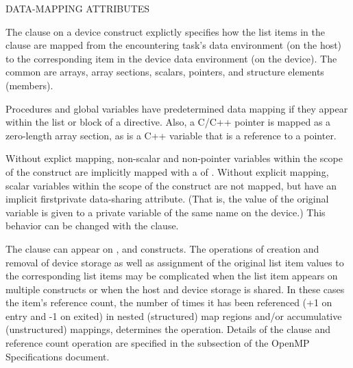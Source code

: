 \bigskip
DATA-MAPPING ATTRIBUTES

The  clause on a device construct explictly specifies how the list items in
the clause are mapped from the encountering task's data environment (on the host)
to the corresponding item in the device data environment (on the device).
The common  are arrays, array sections, scalars, pointers, and
structure elements (members). 

Procedures and global variables have predetermined data mapping if they appear
within the list or block of a  directive. Also, a C/C++ pointer
is mapped as a zero-length array section, as is a C++ variable that is a reference to a pointer.

Without explict mapping, non-scalar and non-pointer variables within the scope of the 
construct are implicitly mapped with a  of .
Without explicit mapping, scalar variables within the scope of the 
construct are not mapped, but have an implicit firstprivate data-sharing
attribute. (That is, the value of the original variable is given to a private
variable of the same name on the device.) This behavior can be changed with
the  clause.

The  clause can appear on ,  and 
 constructs.  The operations of creation and
removal of device storage as well as assignment of the original list item 
values to the corresponding list items may be complicated when the list 
item appears on multiple constructs or when the host and device storage 
is shared. In these cases the item's reference count, the number of times
it has been referenced (+1 on entry and -1 on exited) in nested (structured)
map regions and/or accumulative (unstructured) mappings, determines the operation.
Details of the  clause and reference count operation are specified 
in the  subsection of the OpenMP Specifications document.
